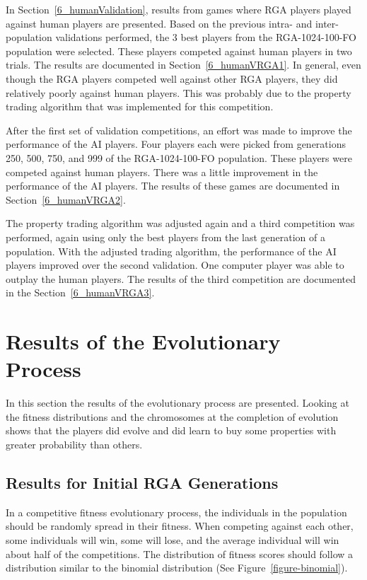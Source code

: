 In Section~\ref{6_humanValidation}, results from games where RGA players played
against human players are presented. Based on the previous intra- and
inter-population validations performed, the 3 best players from the
RGA-1024-100-FO population were selected. These players competed against human
players in two trials. The results are documented in Section~\ref{6_humanVRGA1}.
In general, even though the RGA players competed well against other RGA
players, they did relatively poorly against human players. This was probably
due to the property trading algorithm that was implemented for this competition.

After the first set of validation competitions, an effort was made to improve
the performance of the AI players. Four players each were picked from
generations 250, 500, 750, and 999 of the RGA-1024-100-FO population. These
players were competed against human players. There was a little improvement in
the performance of the AI players. The results of these games are documented in
Section~\ref{6_humanVRGA2}.

The property trading algorithm was adjusted again and a third competition was
performed, again using only the best players from the last generation of a
population. With the adjusted trading algorithm, the performance of the AI
players improved over the second validation. One computer player was able to
outplay the human players. The results of the third competition are documented
in the Section~\ref{6_humanVRGA3}.

\section{Results of the Evolutionary Process}\label{6_evoresults}

In this section the results of the evolutionary process are presented. Looking at
the fitness distributions and the chromosomes at the completion of evolution
shows that the players did evolve and did learn to buy some properties with greater
probability than others.

\subsection{Results for Initial RGA Generations}

In a competitive fitness evolutionary process, the individuals in the population
should be randomly spread in their fitness. When competing against each other,
some individuals will win, some will lose, and the average individual will win
about half of the competitions. The distribution of fitness scores should follow
a distribution similar to the binomial distribution (See
Figure~\ref{figure-binomial}).

